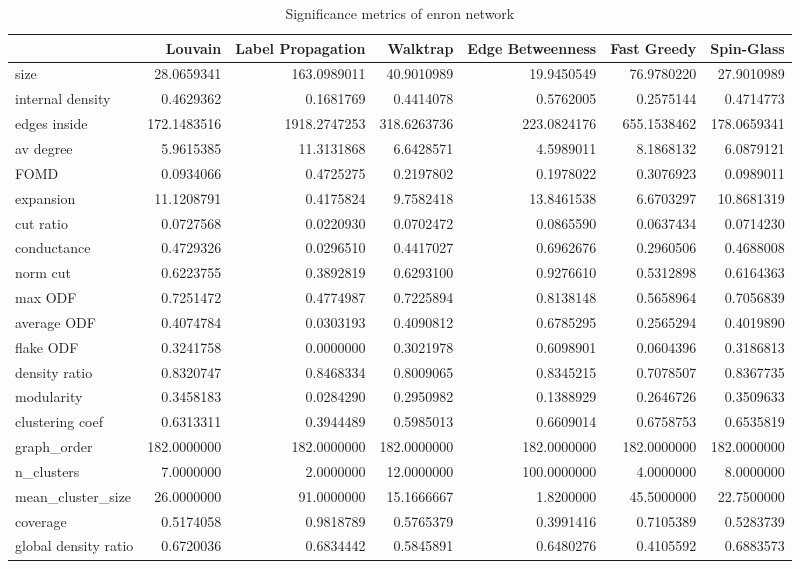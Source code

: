 \begin{table}[ht]
\centering
\begin{tabular}{lrrrrrr}
  \hline
 & Louvain & Label Propagation & Walktrap & Edge Betweenness & Fast Greedy & Spin-Glass \\ 
  \hline
size & 28.0659341 & 163.0989011 & 40.9010989 & 19.9450549 & 76.9780220 & 27.9010989 \\ 
  internal density & 0.4629362 & 0.1681769 & 0.4414078 & 0.5762005 & 0.2575144 & 0.4714773 \\ 
  edges inside & 172.1483516 & 1918.2747253 & 318.6263736 & 223.0824176 & 655.1538462 & 178.0659341 \\ 
  av degree & 5.9615385 & 11.3131868 & 6.6428571 & 4.5989011 & 8.1868132 & 6.0879121 \\ 
  FOMD & 0.0934066 & 0.4725275 & 0.2197802 & 0.1978022 & 0.3076923 & 0.0989011 \\ 
  expansion & 11.1208791 & 0.4175824 & 9.7582418 & 13.8461538 & 6.6703297 & 10.8681319 \\ 
  cut ratio & 0.0727568 & 0.0220930 & 0.0702472 & 0.0865590 & 0.0637434 & 0.0714230 \\ 
  conductance & 0.4729326 & 0.0296510 & 0.4417027 & 0.6962676 & 0.2960506 & 0.4688008 \\ 
  norm cut & 0.6223755 & 0.3892819 & 0.6293100 & 0.9276610 & 0.5312898 & 0.6164363 \\ 
  max ODF & 0.7251472 & 0.4774987 & 0.7225894 & 0.8138148 & 0.5658964 & 0.7056839 \\ 
  average ODF & 0.4074784 & 0.0303193 & 0.4090812 & 0.6785295 & 0.2565294 & 0.4019890 \\ 
  flake ODF & 0.3241758 & 0.0000000 & 0.3021978 & 0.6098901 & 0.0604396 & 0.3186813 \\ 
  density ratio & 0.8320747 & 0.8468334 & 0.8009065 & 0.8345215 & 0.7078507 & 0.8367735 \\ 
  modularity & 0.3458183 & 0.0284290 & 0.2950982 & 0.1388929 & 0.2646726 & 0.3509633 \\ 
  clustering coef & 0.6313311 & 0.3944489 & 0.5985013 & 0.6609014 & 0.6758753 & 0.6535819 \\ 
  graph\_order & 182.0000000 & 182.0000000 & 182.0000000 & 182.0000000 & 182.0000000 & 182.0000000 \\ 
  n\_clusters & 7.0000000 & 2.0000000 & 12.0000000 & 100.0000000 & 4.0000000 & 8.0000000 \\ 
  mean\_cluster\_size & 26.0000000 & 91.0000000 & 15.1666667 & 1.8200000 & 45.5000000 & 22.7500000 \\ 
  coverage & 0.5174058 & 0.9818789 & 0.5765379 & 0.3991416 & 0.7105389 & 0.5283739 \\ 
  global density ratio & 0.6720036 & 0.6834442 & 0.5845891 & 0.6480276 & 0.4105592 & 0.6883573 \\ 
   \hline
\end{tabular}

\caption{Significance metrics of enron network}
\label{tab:sig_enron}
\end{table}
